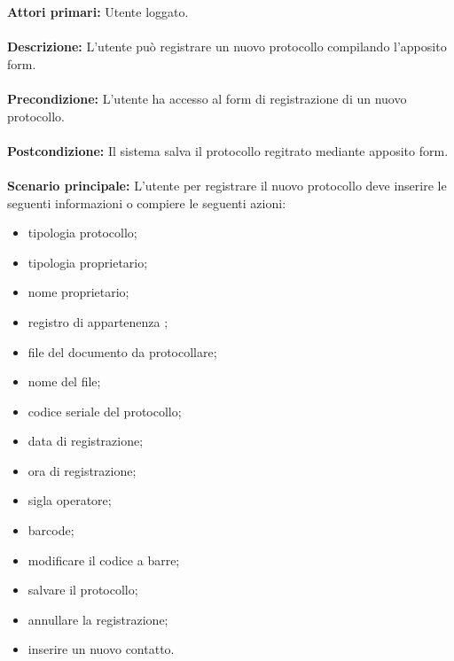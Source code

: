     \textbf{Attori primari:} Utente loggato.
    \\ 
    \\
    \textbf{Descrizione:} L'utente può registrare un nuovo protocollo compilando l'apposito form.
    \\
    \\
    \textbf{Precondizione:} L'utente ha accesso al form di registrazione di un nuovo protocollo.
    \\
    \\
    \textbf{Postcondizione:} Il sistema salva il protocollo regitrato mediante apposito form.
    \\
    \\
    \textbf{Scenario principale:} L'utente per registrare il nuovo protocollo deve inserire le seguenti informazioni o compiere le seguenti azioni:
            \begin{itemize}
                \item tipologia protocollo;
                \item tipologia proprietario;
                \item nome proprietario;
                \item registro di appartenenza ;
                \item file del documento da protocollare;
                \item nome del file;
                \item codice seriale del protocollo;
                \item data di registrazione;
                \item ora di registrazione;
                \item sigla operatore;
                \item barcode;
                \item modificare il codice a barre;
                \item salvare il protocollo;
                \item annullare la registrazione;
                \item inserire un nuovo contatto.
            \end{itemize}

